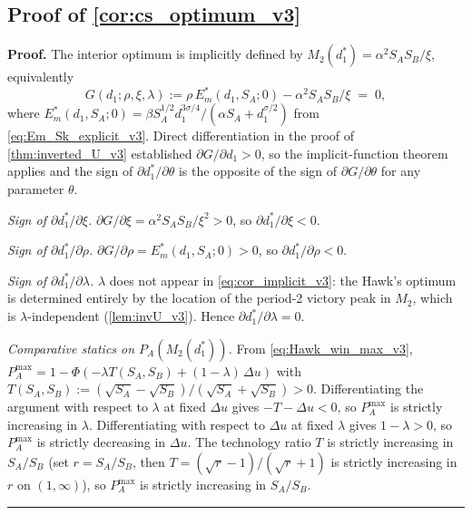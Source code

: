 \documentclass[11pt,twoside]{extarticle}
\newenvironment{proof}[1][Proof]{\noindent \textbf{#1.} }{\ \rule{0.5em}{0.5em}}
\begin{document}
\subsection*{Proof of \autoref{cor:cs_optimum_v3}} \label{app:proof:cs_optimum_v3}
\begin{proof}
The interior optimum is implicitly defined by $M_2(d_1^*)=\alpha^2 S_A S_B/\xi$, equivalently
\begin{equation}\label{eq:cor_implicit_v3}
G(d_1;\rho,\xi,\lambda):=\rho\,E_m^*(d_1,S_A;0)-\alpha^2 S_A S_B/\xi\;=\;0,
\end{equation}
where $E_m^*(d_1,S_A;0)=\beta S_A^{1/2} d_1^{3\sigma/4}/(\alpha S_A+d_1^{\sigma/2})$ from \eqref{eq:Em_Sk_explicit_v3}. Direct differentiation in the proof of \autoref{thm:inverted_U_v3} established $\partial G/\partial d_1>0$, so the implicit-function theorem applies and the sign of $\partial d_1^*/\partial\theta$ is the opposite of the sign of $\partial G/\partial\theta$ for any parameter $\theta$.

\emph{Sign of $\partial d_1^*/\partial\xi$.} $\partial G/\partial\xi=\alpha^2 S_A S_B/\xi^2>0$, so $\partial d_1^*/\partial\xi<0$.

\emph{Sign of $\partial d_1^*/\partial\rho$.} $\partial G/\partial\rho=E_m^*(d_1,S_A;0)>0$, so $\partial d_1^*/\partial\rho<0$.

\emph{Sign of $\partial d_1^*/\partial\lambda$.} $\lambda$ does not appear in \eqref{eq:cor_implicit_v3}: the Hawk's optimum is determined entirely by the location of the period-2 victory peak in $M_2$, which is $\lambda$-independent (\autoref{lem:invU_v3}). Hence $\partial d_1^*/\partial\lambda=0$.

\emph{Comparative statics on $P_A(M_2(d_1^*))$.} From \eqref{eq:Hawk_win_max_v3},
$P_A^{\max}=1-\Phi(-\lambda T(S_A,S_B)+(1-\lambda)\,\Delta u)$ with $T(S_A,S_B):=(\sqrt{S_A}-\sqrt{S_B})/(\sqrt{S_A}+\sqrt{S_B})>0$. Differentiating the argument with respect to $\lambda$ at fixed $\Delta u$ gives $-T-\Delta u<0$, so $P_A^{\max}$ is strictly increasing in $\lambda$. Differentiating with respect to $\Delta u$ at fixed $\lambda$ gives $1-\lambda>0$, so $P_A^{\max}$ is strictly decreasing in $\Delta u$. The technology ratio $T$ is strictly increasing in $S_A/S_B$ (set $r=S_A/S_B$, then $T=(\sqrt r-1)/(\sqrt r+1)$ is strictly increasing in $r$ on $(1,\infty)$), so $P_A^{\max}$ is strictly increasing in $S_A/S_B$.
\end{proof}

\end{document}
